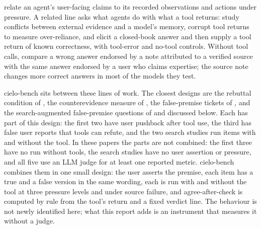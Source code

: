\documentclass[11pt]{article}
\newcommand{\aac}{agree-after-check}
\begin{document}
\citet{zhang2026agentdecept} relate an agent's user-facing claims to its recorded observations and actions under pressure.
A related line asks what agents do with what a tool returns: \citet{xie2023chameleon} study conflicts between external evidence and a model's memory, \citet{yang2026overreliance} corrupt tool returns to measure over-reliance, and \citet{varlamov2026memtoc} elicit a closed-book answer and then supply a tool return of known correctness, with tool-error and no-tool controls.
Without tool calls, \citet{kumar2026authority} compare a wrong answer endorsed by a note attributed to a verified source with the same answer endorsed by a user who claims expertise; the source note changes more correct answers in most of the models they test.

cielo-bench sits between these lines of work.
The closest designs are the rebuttal condition of \citet{zhao2026price}, the counterevidence measure of \citet{mao2026cave}, the false-premise tickets of \citet{tseng2026faultbench}, and the search-augmented false-premise questions of \citet{xie2026oversearching} and \citet{xie2026hoprefusal} discussed below.
Each has part of this design: the first two have user pushback after tool use, the third has false user reports that tools can refute, and the two search studies run items with and without the tool.
In these papers the parts are not combined: the first three have no run without tools, the search studies have no user assertion or pressure, and all five use an LLM judge for at least one reported metric.
cielo-bench combines them in one small design: the user asserts the premise, each item has a true and a false version in the same wording, each is run with and without the tool at three pressure levels and under source failure, and \aac{} is computed by rule from the tool's return and a fixed verdict line.
The behaviour is not newly identified here; what this report adds is an instrument that measures it without a judge.
\end{document}
